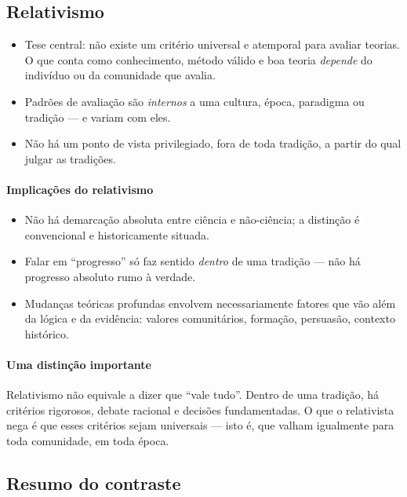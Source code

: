 \documentclass[9pt,a4paper]{extarticle}
\newcommand{\impt}[1]{\textcolor{important}{#1}}
\newcommand{\ntc}[1]{\textcolor{notice}{#1}}
\begin{document}
\subsection{Relativismo}

\begin{itemize}
    \item \ntc{Tese central}: \impt{não existe um critério universal e atemporal} para avaliar teorias. O que conta como conhecimento, método válido e boa teoria \emph{depende} do indivíduo ou da comunidade que avalia.
    \item Padrões de avaliação são \emph{internos} a uma cultura, época, paradigma ou tradição --- e variam com eles.
    \item Não há um ponto de vista privilegiado, fora de toda tradição, a partir do qual julgar as tradições.
\end{itemize}

\paragraph{Implicações do relativismo}
\begin{itemize}
    \item \impt{Não há demarcação absoluta} entre ciência e não-ciência; a distinção é convencional e historicamente situada.
    \item Falar em ``progresso'' só faz sentido \emph{dentro} de uma tradição --- não há progresso absoluto rumo à verdade.
    \item Mudanças teóricas profundas envolvem necessariamente fatores que vão além da lógica e da evidência: valores comunitários, formação, persuasão, contexto histórico.
\end{itemize}

\paragraph{Uma distinção importante}

Relativismo não equivale a dizer que ``vale tudo''. Dentro de uma tradição, há critérios rigorosos, debate racional e decisões fundamentadas. O que o relativista nega é que esses critérios sejam \impt{universais} --- isto é, que valham igualmente para toda comunidade, em toda época.

\subsection{Resumo do contraste}
\end{document}
